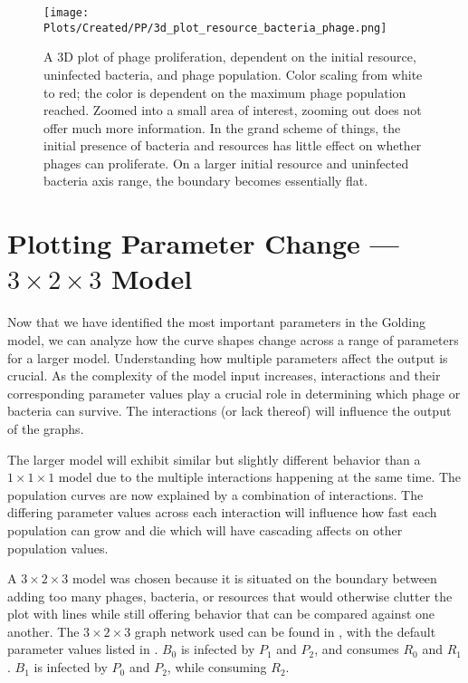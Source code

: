 \begin{figure}[ht!]
    \texttt{[image: Plots/Created/PP/3d\_plot\_resource\_bacteria\_phage.png]}
    \centering
    \caption{
        A 3D plot of phage proliferation, dependent on the initial resource, uninfected bacteria, and phage population. 
        Color scaling from white to red; the color is dependent on the maximum phage population reached. 
        Zoomed into a small area of interest, zooming out does not offer much more information. 
        In the grand scheme of things, the initial presence of bacteria and resources has little effect on whether phages can proliferate. 
        On a larger initial resource and uninfected bacteria axis range, the boundary becomes essentially flat. 
            \label{fig:created:3D_phase_portrait}
    }
\end{figure}

\section{Plotting Parameter Change — $3\times 2\times 3$ Model}
Now that we have identified the most important parameters in the Golding model, we can analyze how the curve shapes change across a range of parameters for a larger model. 
Understanding how multiple parameters affect the output is crucial. 
As the complexity of the model input increases, interactions and their corresponding parameter values play a crucial role in determining which phage or bacteria can survive. 
The interactions (or lack thereof) will influence the output of the graphs. 

The larger model will exhibit similar but slightly different behavior than a $1\times 1\times 1$ model due to the multiple interactions happening at the same time. 
The population curves are now explained by a combination of interactions. 
The differing parameter values across each interaction will influence how fast each population can grow and die which will have cascading affects on other population values. 

A $3\times 2\times 3$ model was chosen because it is situated on the boundary between adding too many phages, bacteria, or resources that would otherwise clutter the plot with lines while still offering behavior that can be compared against one another. 
The $3\times 2\times 3$ graph network used can be found in , with the default parameter values listed in . 
$B_0$ is infected by $P_1$ and $P_2$, and consumes $R_0$ and $R_1$. 
$B_1$ is infected by $P_0$ and $P_2$, while consuming $R_2$. 

